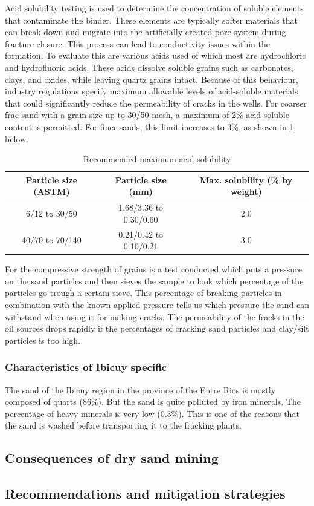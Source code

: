 Acid solubility testing is used to determine the concentration of soluble elements that contaminate the binder. These elements are typically softer materials that can break down and migrate into the artificially created pore system during fracture closure. This process can lead to conductivity issues within the formation.
To evaluate this are various acids  used of which most are hydrochloric and hydrofluoric acids. These acids dissolve soluble grains such as carbonates, clays, and oxides, while leaving quartz grains intact. Because of this behaviour, industry regulations specify maximum allowable levels of acid-soluble materials that could significantly reduce the permeability of cracks in the wells.
For coarser frac sand with a grain size up to 30/50 mesh, a maximum of 2\% acid-soluble content is permitted. For finer sands, this limit increases to 3\%, as shown in \ref{tab:acid} below.

\begin{table}[h!]
\centering
\begin{tabular}{|c|c|c|}
\hline
\textbf{Particle size (ASTM)} & \textbf{Particle size (mm)} & \textbf{Max. solubility (\% by weight)} \\ \hline
6/12 to 30/50 & 1.68/3.36 to 0.30/0.60 & 2.0 \\ \hline
40/70 to 70/140 & 0.21/0.42 to 0.10/0.21 & 3.0 \\ \hline
\end{tabular}
\caption{Recommended maximum acid solubility \autocite{secretariadepoliticamineraArenasParaFracking2019}}
\label{tab:acid}
\end{table}

For the compressive strength of grains is a test conducted which puts a pressure on the sand particles and then sieves the sample to look which percentage of the particles go trough a certain sieve. This percentage of breaking particles in combination with the known applied pressure tells us which pressure the sand can withstand when using it for making cracks.
The permeability of the fracks in the oil sources drops rapidly if the percentages of cracking sand particles and clay/silt particles is too high. 

\subsubsection{Characteristics of Ibicuy specific}

The sand of the Ibicuy region in the province of the Entre Rios is mostly composed of quarts (86\%). But the sand is quite polluted by iron minerals. The percentage of heavy minerals is very low (0.3\%). This is one of the reasons that the sand is washed before transporting it to the fracking plants. 

\subsection{Consequences of dry sand mining}


\subsection{Recommendations and mitigation strategies}
